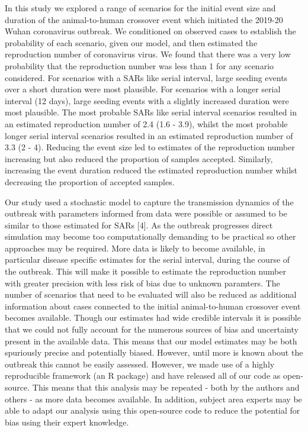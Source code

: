 \documentclass[]{article}
\begin{document}
In this study we explored a range of scenarios for the initial event
size and duration of the animal-to-human crossover event which initiated
the 2019-20 Wuhan coronavirus outbreak. We conditioned on observed cases
to establish the probability of each scenario, given our model, and then
estimated the reproduction number of coronavirus virus. We found that
there was a very low probability that the reproduction number was less
than 1 for any scenario considered. For scenarios with a SARs like
serial interval, large seeding events over a short duration were most
plausible. For scenarios with a longer serial interval (12 days), large
seeding events with a slightly increased duration were most plausible.
The most probable SARs like serial interval scenarios resulted in an
estimated reproduction number of 2.4 (1.6 - 3.9), whilst the most
probable longer serial interval scenarios resulted in an estimated
reproduction number of 3.3 (2 - 4). Reducing the event size led to
estimates of the reproduction number increasing but also reduced the
proportion of samples accepted. Similarly, increasing the event duration
reduced the estimated reproduction number whilst decreasing the
proportion of accepted samples.

Our study used a stochastic model to capture the transmission dynamics
of the outbreak with parameters informed from data were possible or
assumed to be similar to those estimated for SARs {[}4{]}. As the
outbreak progresses direct simulation may become too computationally
demanding to be practical so other approaches may be required. More data
is likely to become available, in particular disease specific estimates
for the serial interval, during the course of the outbreak. This will
make it possible to estimate the reproduction number with greater
precision with less risk of bias due to unknown paramters. The number of
scenarios that need to be evaluated will also be reduced as additional
information about cases connected to the initial animal-to-human
crossover event becomes available. Though our estimates had wide
credible intervals it is possible that we could not fully account for
the numerous sources of bias and uncertainty present in the available
data. This means that our model estimates may be both spuriously precise
and potentially biased. However, until more is known about the outbreak
this cannot be easily assessed. However, we made use of a highly
reproducible framework (an R package) and have released all of our code
as open-source. This means that this analysis may be repeated - both by
the authors and others - as more data becomes available. In addition,
subject area experts may be able to adapt our analysis using this
open-source code to reduce the potential for bias using their expert
knowledge.
\end{document}

